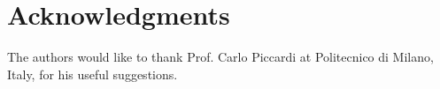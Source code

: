 \documentclass[runningheads]{llncs}
\begin{document}
    
    
    
    
    

%     
%      
%    
    \vspace{-10pt}
    \section*{Acknowledgments}
    \vspace{-10pt}
    The authors would like to thank Prof. Carlo Piccardi at Politecnico di Milano, Italy, for his useful suggestions.

    
\end{document}
